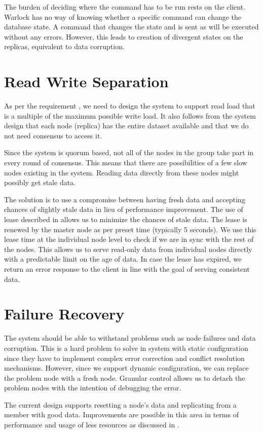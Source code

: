 The burden of deciding where the command has to be run rests on the client.
Warlock has no way of knowing whether a specific command can change the 
database state. A
command that changes the state and is sent as  will be executed 
without any errors. However, this leads to creation of divergent states
on the replicas, equivalent to data corruption.

\section{Read Write Separation}

As per the requirement , we need to design the
system to support read load that is a multiple of the maximum possible write
load. It also follows from the system design that each node (replica) has the
entire dataset available and that we do not need consensus to access it. 

Since the system is quorum based, not all of the nodes in the group take part
in every round of consensus. This means that there are possibilities of a few 
slow nodes existing in the system. Reading data directly from these nodes might
possibly get stale data.

The solution is to use a compromise between having fresh data and accepting 
chances of slightly stale data in lieu of performance improvement. The
use of lease described in  allows us to minimize the
chances of stale data. The lease is renewed by the master node as per preset 
time (typically 5 seconds). We use this lease time at the individual node level 
to check if we are in sync with the rest of the nodes. This allows us to serve 
read-only data from individual nodes directly with a predictable limit on the 
age of data. In case the lease has expired, we return an error response to
the client in line with the goal of serving consistent data.

\section{Failure Recovery}

The system should be able to withstand problems such as node failures and data
corruption. This is a hard problem to solve in system with static configuration
since they have to implement complex error correction and conflict resolution
mechanisms. However, since we support dynamic configuration, we can replace
the problem node with a fresh node. Granular control allows us to detach the
problem nodes with the intention of debugging the error.

The current design supports resetting a node's data and replicating from
a member with good data. Improvements are possible in this area in terms of
performance and usage of less resources as discussed in
.

